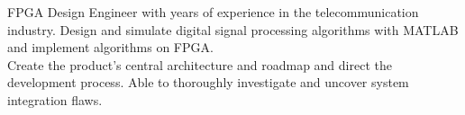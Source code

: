 \setcounter{experience_years}{\year}
\addtocounter{experience_years}{-2013}

\par{
    FPGA Design Engineer with \the\value{experience_years}{\small +} years of experience
    in the telecommunication industry. Design and simulate digital signal processing
    algorithms with MATLAB and implement algorithms on FPGA.\\
    Create the product's central architecture and roadmap and direct the development process.
    Able to thoroughly investigate and uncover system integration flaws.
}
